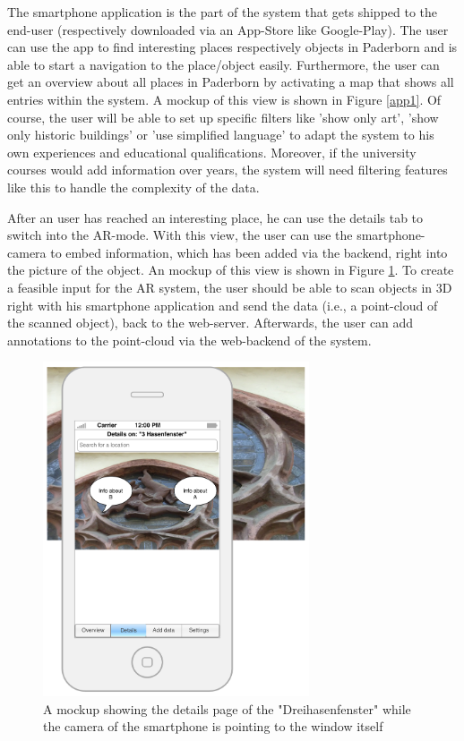 The smartphone application is the part of the system that gets shipped to the end-user (respectively downloaded via an App-Store like Google-Play). The user can use the app to find interesting places respectively objects in Paderborn and is able to start a navigation to the place/object easily. Furthermore, the user can get an overview about all places in Paderborn by activating a map that shows all entries within the system. A mockup of this view is shown in Figure \ref{app1}. Of course, the user will be able to set up specific filters like 'show only art', 'show only historic buildings' or 'use simplified language' to adapt the system to his own experiences and educational qualifications. Moreover, if the university courses would add information over years, the system will need filtering features like this to handle the complexity of the data.

After an user has reached an interesting place, he can use the details tab to switch into the \ac{AR}-mode. With this view, the user can use the smartphone-camera to embed information, which has been added via the backend, right into the picture of the object. An mockup of this view is shown in Figure \ref{app2}. 
To create a feasible input for the \ac{AR} system, the user should be able to scan objects in 3D right with his smartphone application and send the data (i.e., a point-cloud of the scanned object), back to the web-server.  Afterwards, the user can add annotations to the point-cloud via the web-backend of the system.  

\begin{figure}[th]
\centerline{\includegraphics[width=0.7\textwidth]{gfx/mockup_app_2}}
\caption{A mockup showing the details page of the "Dreihasenfenster" while the camera of the smartphone is pointing to the window itself}
\label{app2}
\end{figure}

